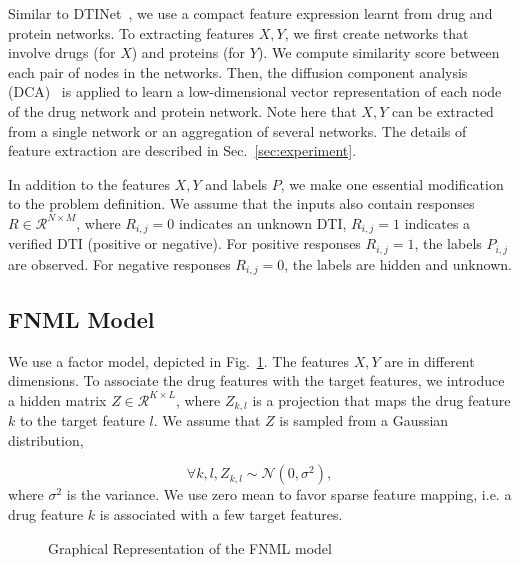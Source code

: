 \documentclass[journal]{IEEEtran}
\begin{document}
Similar to DTINet~\cite{Luo2017Network}, we use a compact feature expression learnt from drug and protein networks. To extracting features $X,Y$, we first create networks that involve drugs (for $X$) and proteins (for $Y$). We compute similarity score between each pair of nodes in the networks. Then, the diffusion component analysis (DCA)~\cite{Cho2015DCA} is applied to learn a low-dimensional vector representation of each node of the drug network and protein network. Note here that $X,Y$ can be extracted from a single network or an aggregation of several networks. The details of feature extraction are described in Sec.~\ref{sec:experiment}.

In addition to the features $X,Y$ and labels $P$, we make one essential modification to the problem definition. We assume that the inputs also contain responses $R\in \mathcal{R}^{N\times M}$, where $R_{i,j}=0$ indicates an unknown DTI, $R_{i,j}=1$ indicates a verified DTI (positive or negative). For positive responses $R_{i,j}=1$, the labels $P_{i,j}$ are observed. For negative responses $R_{i,j}=0$, the labels are hidden and unknown.

\subsection{FNML Model}\label{sec:model}

We use a factor model, depicted in Fig.~\ref{fig:model}. The features $X,Y$ are in different dimensions. To associate the drug features with the target features, we introduce a hidden matrix $Z\in\mathcal{R}^{K\times L}$, where $Z_{k,l}$ is a projection that maps the drug feature $k$ to the target feature $l$. We assume that $Z$ is sampled from a Gaussian distribution,

\begin{equation}\label{equ:z}
\forall k,l, Z_{k,l}\sim \mathcal{N}(0,\sigma^2),
\end{equation}
where $\sigma^2$ is the variance. We use zero mean to favor sparse feature mapping, i.e. a drug feature $k$ is associated with a few target features.

\begin{figure}
  \centering
{}

\caption{Graphical Representation of the FNML model}\label{fig:model}

\end{figure}
\end{document}
